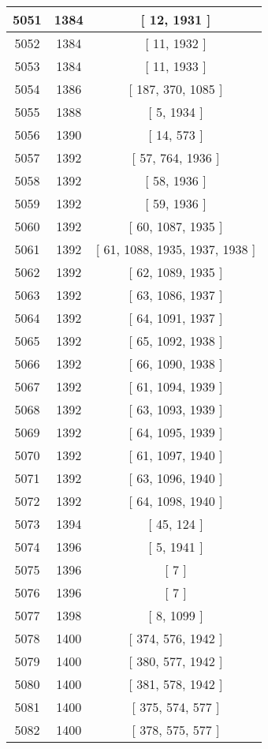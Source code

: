 \begin{center}
\begin{longtable}[H]{|| c c c ||}
\hline
5051 & 1384 & [ 12, 1931 ] \\ 
\hline
5052 & 1384 & [ 11, 1932 ] \\ 
\hline
5053 & 1384 & [ 11, 1933 ] \\ 
\hline
5054 & 1386 & [ 187, 370, 1085 ] \\ 
\hline
5055 & 1388 & [ 5, 1934 ] \\ 
\hline
5056 & 1390 & [ 14, 573 ] \\ 
\hline
5057 & 1392 & [ 57, 764, 1936 ] \\ 
\hline
5058 & 1392 & [ 58, 1936 ] \\ 
\hline
5059 & 1392 & [ 59, 1936 ] \\ 
\hline
5060 & 1392 & [ 60, 1087, 1935 ] \\ 
\hline
5061 & 1392 & [ 61, 1088, 1935, 1937, 1938 ] \\ 
\hline
5062 & 1392 & [ 62, 1089, 1935 ] \\ 
\hline
5063 & 1392 & [ 63, 1086, 1937 ] \\ 
\hline
5064 & 1392 & [ 64, 1091, 1937 ] \\ 
\hline
5065 & 1392 & [ 65, 1092, 1938 ] \\ 
\hline
5066 & 1392 & [ 66, 1090, 1938 ] \\ 
\hline
5067 & 1392 & [ 61, 1094, 1939 ] \\ 
\hline
5068 & 1392 & [ 63, 1093, 1939 ] \\ 
\hline
5069 & 1392 & [ 64, 1095, 1939 ] \\ 
\hline
5070 & 1392 & [ 61, 1097, 1940 ] \\ 
\hline
5071 & 1392 & [ 63, 1096, 1940 ] \\ 
\hline
5072 & 1392 & [ 64, 1098, 1940 ] \\ 
\hline
5073 & 1394 & [ 45, 124 ] \\ 
\hline
5074 & 1396 & [ 5, 1941 ] \\ 
\hline
5075 & 1396 & [ 7 ] \\ 
\hline
5076 & 1396 & [ 7 ] \\ 
\hline
5077 & 1398 & [ 8, 1099 ] \\ 
\hline
5078 & 1400 & [ 374, 576, 1942 ] \\ 
\hline
5079 & 1400 & [ 380, 577, 1942 ] \\ 
\hline
5080 & 1400 & [ 381, 578, 1942 ] \\ 
\hline
5081 & 1400 & [ 375, 574, 577 ] \\ 
\hline
5082 & 1400 & [ 378, 575, 577 ] \\ 

\end{longtable}
\end{center}
